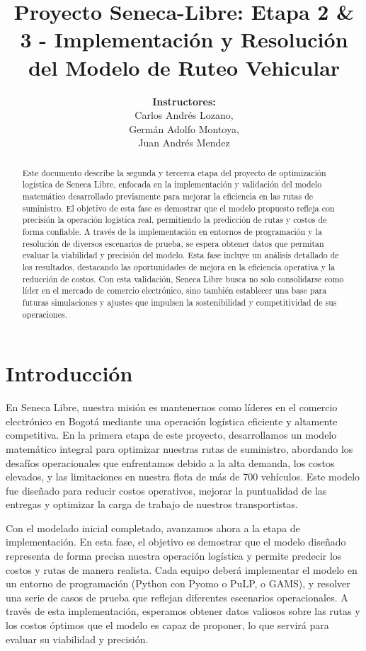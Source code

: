 \documentclass[12pt]{article}
\title{Proyecto Seneca-Libre: Etapa 2 \& 3 - Implementación y Resolución del Modelo de Ruteo Vehicular}
\author{\textbf{Instructores:} \\
Carlos Andrés Lozano, \\
Germán Adolfo Montoya, \\
Juan Andrés Mendez}
\date{}
\begin{document}
\maketitle

\begin{abstract}
Este documento describe la segunda y tercerca etapa del proyecto de optimización logística de Seneca Libre, enfocada en la implementación y validación del modelo matemático desarrollado previamente para mejorar la eficiencia en las rutas de suministro. El objetivo de esta fase es demostrar que el modelo propuesto refleja con precisión la operación logística real, permitiendo la predicción de rutas y costos de forma confiable. A través de la implementación en entornos de programación y la resolución de diversos escenarios de prueba, se espera obtener datos que permitan evaluar la viabilidad y precisión del modelo. Esta fase incluye un análisis detallado de los resultados, destacando las oportunidades de mejora en la eficiencia operativa y la reducción de costos. Con esta validación, Seneca Libre busca no solo consolidarse como líder en el mercado de comercio electrónico, sino también establecer una base para futuras simulaciones y ajustes que impulsen la sostenibilidad y competitividad de sus operaciones.
\end{abstract}

\section{Introducción}
En Seneca Libre, nuestra misión es mantenernos como líderes en el comercio electrónico en Bogotá mediante una operación logística eficiente y altamente competitiva. En la primera etapa de este proyecto, desarrollamos un modelo matemático integral para optimizar nuestras rutas de suministro, abordando los desafíos operacionales que enfrentamos debido a la alta demanda, los costos elevados, y las limitaciones en nuestra flota de más de 700 vehículos. Este modelo fue diseñado para reducir costos operativos, mejorar la puntualidad de las entregas y optimizar la carga de trabajo de nuestros transportistas.

Con el modelado inicial completado, avanzamos ahora a la etapa de implementación. En esta fase, el objetivo es demostrar que el modelo diseñado representa de forma precisa nuestra operación logística y permite predecir los costos y rutas de manera realista. Cada equipo deberá implementar el modelo en un entorno de programación (Python con Pyomo o PuLP, o GAMS), y resolver una serie de casos de prueba que reflejan diferentes escenarios operacionales. A través de esta implementación, esperamos obtener datos valiosos sobre las rutas y los costos óptimos que el modelo es capaz de proponer, lo que servirá para evaluar su viabilidad y precisión.
\end{document}
